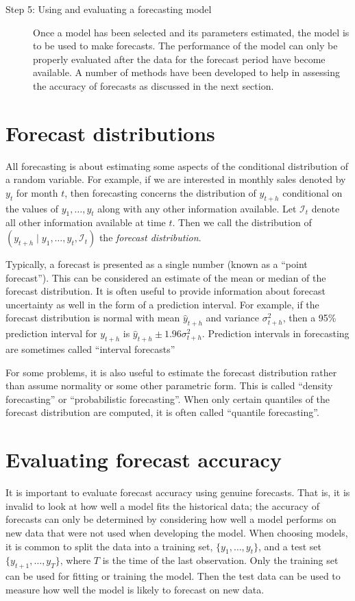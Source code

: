 \documentclass[a4paper,10pt]{article}
\begin{document}
\begin{description}
  \item[Step 5: Using and evaluating a forecasting model]
    Once a model has been selected and its parameters estimated, the model is to be used to make forecasts. The performance of the model can only be properly evaluated after the data for the forecast period have become available. A number of methods have been developed to help in assessing the accuracy of forecasts as discussed in the next section.

\end{description}

\section{Forecast distributions}

All forecasting is about estimating some aspects of the conditional distribution of a random variable. For example, if we are interested in monthly sales denoted by $y_t$ for month $t$, then forecasting concerns the distribution of $y_{t+h}$ conditional on the values of $y_1,\dots,y_t$ along with any other information available. Let $\mathcal{I}_t$ denote all other information available at time $t$. Then we call the distribution of $(y_{t+h} \mid y_1,\dots,y_t,\mathcal{I}_t)$ the \textit{forecast distribution}.

Typically, a forecast is presented as a single number (known as a ``point forecast''). This can be considered an estimate of the mean or median of the forecast distribution. It is often useful to provide information about forecast uncertainty as well in the form of a prediction interval. For example, if the forecast distribution is normal with mean $\hat{y}_{t+h}$ and variance $\sigma^2_{t+h}$, then a 95\% prediction interval for $y_{t+h}$ is $\hat{y}_{t+h}\pm 1.96\sigma_{t+h}^2$. Prediction intervals in forecasting are sometimes called ``interval forecasts''

For some problems, it is also useful to estimate the forecast distribution rather than assume normality or some other parametric form. This is called ``density forecasting'' or ``probabilistic forecasting''. When only certain quantiles of the forecast distribution are computed, it is often called ``quantile forecasting''.

\section{Evaluating forecast accuracy}

It is important to evaluate forecast accuracy using genuine forecasts. That is, it is invalid to look at how well a model fits the historical data; the accuracy of forecasts can only be determined by considering how well a model performs on new data that were not used when developing the model. When choosing models, it is common to split the data into a training set, $\{y_1,\dots,y_t\}$, and a test set $\{y_{t+1}, \dots, y_{T}\}$, where $T$ is the time of the last observation. Only the training set can be used for fitting or training the model. Then the test data can be used to measure how well the model is likely to forecast on new data.
\end{document}
